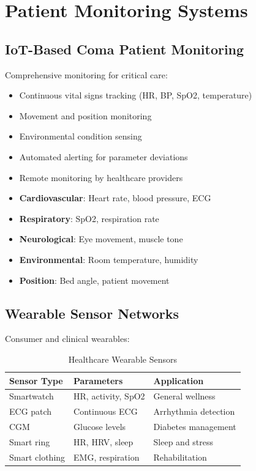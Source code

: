 \documentclass[12pt,a4paper]{article}
\begin{document}
\section{Patient Monitoring Systems}

\subsection{IoT-Based Coma Patient Monitoring}

Comprehensive monitoring for critical care:
\begin{itemize}
    \item Continuous vital signs tracking (HR, BP, SpO2, temperature)
    \item Movement and position monitoring
    \item Environmental condition sensing
    \item Automated alerting for parameter deviations
    \item Remote monitoring by healthcare providers
\end{itemize}

\begin{tcolorbox}[colback=healthred!10, colframe=healthred, title=Coma Monitoring Parameters]
\begin{itemize}
    \item \textbf{Cardiovascular}: Heart rate, blood pressure, ECG
    \item \textbf{Respiratory}: SpO2, respiration rate
    \item \textbf{Neurological}: Eye movement, muscle tone
    \item \textbf{Environmental}: Room temperature, humidity
    \item \textbf{Position}: Bed angle, patient movement
\end{itemize}
\end{tcolorbox}

\subsection{Wearable Sensor Networks}

Consumer and clinical wearables:
\begin{table}[H]
\centering
\caption{Healthcare Wearable Sensors}
\begin{tabular}{lll}
\toprule
\textbf{Sensor Type} & \textbf{Parameters} & \textbf{Application} \\
\midrule
Smartwatch & HR, activity, SpO2 & General wellness \\
ECG patch & Continuous ECG & Arrhythmia detection \\
CGM & Glucose levels & Diabetes management \\
Smart ring & HR, HRV, sleep & Sleep and stress \\
Smart clothing & EMG, respiration & Rehabilitation \\
\bottomrule
\end{tabular}
\end{table}
\end{document}
